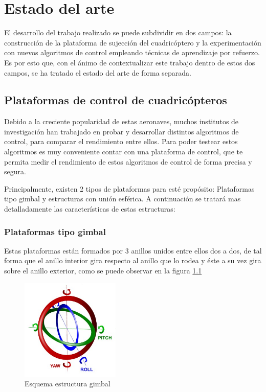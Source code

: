 \chapter{Estado del arte}

El desarrollo del trabajo realizado se puede subdividir en dos campos: la construcción de la plataforma de sujección del cuadricóptero y la experimentación con nuevos algoritmos de control empleando técnicas de aprendizaje por refuerzo. Es por esto que, con el ánimo de contextualizar este trabajo dentro de estos dos campos, se ha tratado el estado del arte de forma separada.

\section{Plataformas de control de cuadricópteros}

Debido a la creciente popularidad de estas aeronaves, muchos institutos de investigación han trabajado en probar y desarrollar distintos algoritmos de control, para comparar el rendimiento entre ellos. Para poder testear estos algoritmos es muy conveniente contar con una plataforma de control, que te permita medir el rendimiento de estos algoritmos de control de forma precisa y segura.

Principalmente, existen 2 tipos de plataformas para esté propósito: Plataformas tipo gimbal y estructuras con unión esférica. A continuación se tratará mas detalladamente las características de estas estructuras:

\subsection{Plataformas tipo gimbal}

Estas plataformas están formados por 3 anillos unidos entre ellos dos a dos, de tal forma que el anillo interior gira respecto al anillo que lo rodea y éste a su vez gira sobre el anillo exterior, como se puede observar en la figura \ref{gimbal}

\begin{figure}[htb!]
	\centering
	\includegraphics[width=0.42\textwidth]{estadodelarte/gimbal}
	\caption{Esquema estructura gimbal}
	\label{gimbal}
\end{figure}

